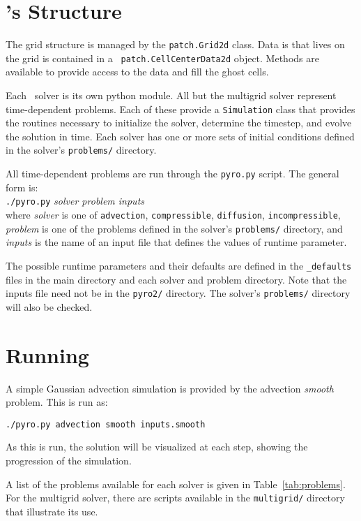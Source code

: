 \section{\pyro 's Structure}

The grid structure is managed by the {\tt patch.Grid2d} class.  Data
is that lives on the grid is contained in a {\tt
  patch.CellCenterData2d} object.  Methods are available to provide
access to the data and fill the ghost cells.

Each \pyro\ solver is its own python module.  All but the multigrid
solver represent time-dependent problems.  Each of these provide a
{\tt Simulation} class that provides the routines necessary to
initialize the solver, determine the timestep, and evolve the solution
in time.  Each solver has one or more sets of initial conditions
defined in the solver's {\tt problems/} directory.

All time-dependent problems are run through the {\tt pyro.py} script.
The general form is: \\[0.5em]
{\tt ./pyro.py} {\em solver problem inputs} \\[0.5em]
where {\em solver} is one of {\tt advection}, {\tt compressible},
{\tt diffusion}, {\tt incompressible}, {\em problem} is
one of the problems defined in the solver's {\tt problems/}
directory, and {\em inputs} is the name of an input file
that defines the values of runtime parameter. 

The possible runtime parameters and their defaults are defined in the
{\tt \_defaults} files in the main directory and each solver and
problem directory.  Note that the inputs file need not be in the 
{\tt pyro2/} directory.  The solver's {\tt problems/} directory
will also be checked.

\section{Running \pyro}

A simple Gaussian advection simulation is provided by the advection
{\em smooth} problem.  This is run as:
\begin{verbatim}
./pyro.py advection smooth inputs.smooth
\end{verbatim}
As this is run, the solution will be visualized at each step,
showing the progression of the simulation.  


A list of the problems available for each solver is given in
Table~\ref{tab:problems}.  For the multigrid solver, there are scripts
available in the {\tt multigrid/} directory that illustrate its use.



